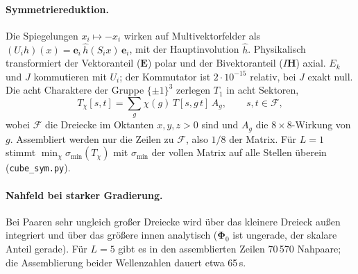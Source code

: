 \documentclass[11pt, a4paper]{article}
\newcommand{\mvec}[1]{\boldsymbol{#1}}
\begin{document}
\paragraph{Symmetriereduktion.} Die Spiegelungen $x_i\mapsto-x_i$ wirken auf
Multivektorfelder als $(U_ih)(x)=\mvec{e}_i\,\hat h(S_ix)\,\mvec{e}_i$, mit der
Hauptinvolution $\hat h$. Physikalisch transformiert der Vektoranteil ($\mvec{E}$) polar und
der Bivektoranteil ($I\mvec{H}$) axial. $E_k$ und $J$ kommutieren mit $U_i$; der Kommutator
ist $2\cdot10^{-15}$ relativ, bei $J$ exakt null. Die acht Charaktere der Gruppe
$\{\pm1\}^3$ zerlegen $T_1$ in acht Sektoren,
\[
  T_\chi[s,t]=\sum_{g}\chi(g)\,T[s,g\,t]\,A_g,\qquad s,t\in\mathcal{F},
\]
wobei $\mathcal{F}$ die Dreiecke im Oktanten $x,y,z>0$ sind und $A_g$ die $8\times8$-Wirkung
von $g$. Assembliert werden nur die Zeilen zu $\mathcal{F}$, also $1/8$ der Matrix. Für
$L=1$ stimmt $\min_\chi\sigma_{\min}(T_\chi)$ mit $\sigma_{\min}$ der vollen Matrix auf
alle Stellen überein (\texttt{cube\_sym.py}).

\paragraph{Nahfeld bei starker Gradierung.} Bei Paaren sehr ungleich großer Dreiecke
wird über das kleinere Dreieck außen integriert und über das größere innen analytisch
($\mvec\Phi_0$ ist ungerade, der skalare Anteil gerade). Für $L=5$ gibt es in den
assemblierten Zeilen 70\,570 Nahpaare; die Assemblierung beider Wellenzahlen dauert
etwa 65\,s.
\end{document}
